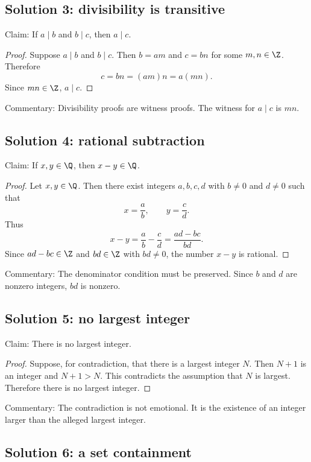 \subsection{Solution 3: divisibility is transitive}

Claim: If $a\mid b$ and $b\mid c$, then $a\mid c$.

\begin{proof}
Suppose $a\mid b$ and $b\mid c$. Then $b=am$ and $c=bn$ for some $m,n\in\Z$. Therefore
\[
c=bn=(am)n=a(mn).
\]
Since $mn\in\Z$, $a\mid c$.
\end{proof}

Commentary: Divisibility proofs are witness proofs. The witness for $a\mid c$ is $mn$.

\subsection{Solution 4: rational subtraction}

Claim: If $x,y\in\Q$, then $x-y\in\Q$.

\begin{proof}
Let $x,y\in\Q$. Then there exist integers $a,b,c,d$ with $b\neq0$ and $d\neq0$ such that
\[
x=\frac ab,\qquad y=\frac cd.
\]
Thus
\[
x-y=\frac ab-\frac cd=\frac{ad-bc}{bd}.
\]
Since $ad-bc\in\Z$ and $bd\in\Z$ with $bd\neq0$, the number $x-y$ is rational.
\end{proof}

Commentary: The denominator condition must be preserved. Since $b$ and $d$ are nonzero integers, $bd$ is nonzero.

\subsection{Solution 5: no largest integer}

Claim: There is no largest integer.

\begin{proof}
Suppose, for contradiction, that there is a largest integer $N$. Then $N+1$ is an integer and $N+1>N$. This contradicts the assumption that $N$ is largest. Therefore there is no largest integer.
\end{proof}

Commentary: The contradiction is not emotional. It is the existence of an integer larger than the alleged largest integer.

\subsection{Solution 6: a set containment}

